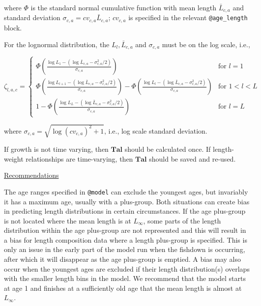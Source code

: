\documentclass[a4paper,11pt,twoside,pdftex,draft]{article}
\begin{document}
where $\Phi$ is the standard normal cumulative function with mean length $\bar L_{c,a}$ and standard deviation $\sigma_{c,a} = cv_{c,a} \bar L_{c,a}$; $cv_{c,a}$ is specified in the relevant  \texttt{@age\_length} block.

For the lognormal distribution, the $L_{l}, \bar L_{c,a}$ and $\sigma_{c,a}$ must be on the log scale, i.e.,

\begin{equation}
\zeta_{l,a,c} =
\begin{cases}
\Phi\left( \frac{\log L_{1} - \left( \log\bar L_{c,a}  - \sigma_{c,a}^2/2 \right)}{\sigma_{c,a}} \right) & \text{for } l = 1 \\

\Phi\left( \frac{\log L_{l+1} - \left( \log\bar L_{c,a}  - \sigma_{c,a}^2/2 \right)}{\sigma_{c,a}} \right) - \Phi\left( \frac{\log L_{l} - \left( \log\bar L_{c,a}  - \sigma_{c,a}^2/2 \right)}{\sigma_{c,a}} \right) & \text{for } 1 < l < L \\

1  - \Phi\left( \frac{\log L_{L} - \left( \log\bar L_{c,a}  - \sigma_{c,a}^2/2 \right)}{\sigma_{c,a}} \right) & \text{for } l = L
\end{cases}
\end{equation}

where $\sigma_{c,a} = \sqrt{\log(cv_{c,a})^2 + 1}$, i.e., log scale standard deviation.

If growth is not time varying, then $\mathbf{Tal}$ should be calculated once. If length-weight relationships are time-varying, then $\mathbf{Tal}$ should be saved and re-used.

\bigskip
\underline{Recommendations}

The age ranges specified in \texttt{@model} can exclude the youngest ages, but invariably it has a maximum age, usually with a plus-group. Both situations can create bias in predicting length distributions in certain circumstances.  If the age plus-group is not located where the mean length is at $L_{\infty}$, some parts of the length distribution within the age plus-group are not represented and this will result in a bias for length composition data where a length plus-group is specified. This is only an issue in the early part of the model run when the fishdown is occurring, after which it will disappear as the age plus-group is emptied.  A bias may also occur when the youngest ages are excluded if their length distribution(s) overlaps with the smaller length bins in the model. We recommend that the model starts at age 1 and finishes at a sufficiently old age that the mean length is almost at $L_{\infty}$. 
\end{document}
